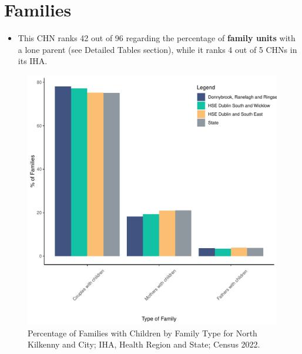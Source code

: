\documentclass{article}
\begin{document}
\section{Families}\label{sect:Fam}
\begin{itemize}
\item This CHN ranks  42 out of 96 regarding the percentage of \textbf{family units} with a lone parent (see Detailed Tables section), while it ranks   4 out of 5 CHNs in its IHA.
\end{itemize}
\begin{figure}[H]
	\centering
	\includegraphics[width = 150mm]{../figures/FamED.pdf}
	\caption{Percentage of Families with Children by Family Type for North Kilkenny and City; IHA, Health Region and State; Census 2022.}
	\label{fig:vbnv}
	\end{figure}
	
\end{document}
